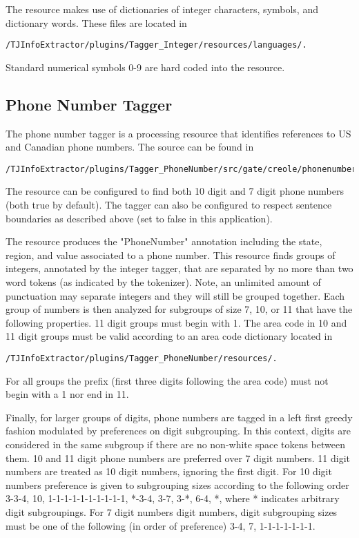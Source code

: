 \documentclass{article}
\begin{document}
The resource makes use of dictionaries of integer characters, symbols, and dictionary words. These files are located in
\begin{lstlisting}[style=Bash]
/TJInfoExtractor/plugins/Tagger_Integer/resources/languages/.
\end{lstlisting} Standard numerical symbols 0-9 are hard coded into the resource.

\subsection{{Phone Number Tagger}}
The phone number tagger is a processing resource that identifies references to US and Canadian
phone numbers. The source can be found in 
\begin{lstlisting}[style=Bash]
/TJInfoExtractor/plugins/Tagger_PhoneNumber/src/gate/creole/phonenumbers/.
\end{lstlisting} The resource 
can be configured to find both 10 digit and 7 digit phone numbers (both true by default). The tagger can also
be configured to respect sentence boundaries as described above (set to false in this application).

The resource produces the "{PhoneNumber}" annotation including the state, region, and value associated to a phone number.
This resource finds groups of integers, annotated by the integer tagger, that are separated by no more than
two word tokens (as indicated by the tokenizer). Note, an unlimited amount of punctuation may separate integers and 
they will still be grouped together. Each group of numbers is then analyzed for subgroups of size 7, 10, or 11 that have the
following properties. 11 digit groups must begin with 1. The area code in 10 and 11 digit groups must be valid according to
an area code dictionary located in 
\begin{lstlisting}[style=Bash]
/TJInfoExtractor/plugins/Tagger_PhoneNumber/resources/.
\end{lstlisting} For all groups the prefix (first 
three digits following the area code) must not begin with a 1 nor end in 11.

Finally, for larger groups of digits, phone numbers are tagged in a left first greedy fashion modulated by preferences on digit subgrouping.
In this context, digits are considered in the same subgroup if there are no non-white space tokens between them. 10 and 11 digit phone numbers are preferred over 7 digit numbers.
11 digit numbers are treated as 10 digit numbers, ignoring the first digit. For 10 digit numbers preference is given to subgrouping sizes according to the following order
3-3-4, 10, 1-1-1-1-1-1-1-1-1-1, *-3-4, 3-7, 3-*, 6-4, *, where * indicates arbitrary digit subgroupings. For 7 digit numbers digit numbers, digit subgrouping sizes must be 
one of the following (in order of preference) 3-4, 7, 1-1-1-1-1-1-1.
\end{document}
